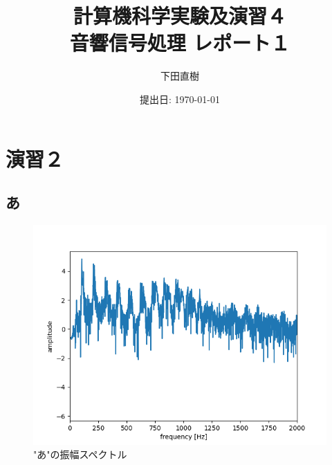 \documentclass[a4paper,11pt]{jsarticle}
\begin{document}
\title{
  計算機科学実験及演習４	\\   %
  \large{音響信号処理 レポート１}	%
}
\author{下田直樹}
\date{提出日: \today}
\maketitle

\tableofcontents
\clearpage

\section{演習２}
\subsection*{あ}
\begin{figure}[H]
  \centering
  \includegraphics[scale=0.5]{../ex2/img/plot-spectrum-2000_a.png}
  \caption{"あ"の振幅スペクトル}
  \label{spectrum_a}
\end{figure}
\end{document}

